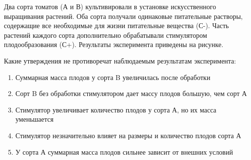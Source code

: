 
Два сорта томатов (А и В) культивировали в
установке искусственного выращивания растений. Оба сорта получали одинаковые
питательные растворы, содержащие все необходимые для жизни питательные вещества
(С-). Часть растений каждого сорта дополнительно обрабатывали стимулятором
плодообразования (С+). Результаты эксперимента приведены на рисунке.


Какие утверждения не противоречат
наблюдаемым результатам эксперимента:

\begin{enumerate}
    \item Суммарная масса плодов у сорта B увеличилась после обработки
    \item Сорт B без обработки стимулятором дает массу плодов большую, чем сорт А
    \item Стимулятор увеличивает количество плодов у сорта А, но их масса уменьшается
    \item Стимулятор незначительно влияет на размеры и количество плодов сорта А
    \item У сорта А суммарная масса плодов сильнее зависит от внешних условий
\end{enumerate}



